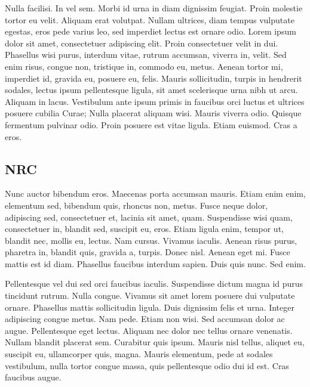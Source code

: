 Nulla facilisi. In vel sem. Morbi id urna in diam dignissim feugiat. Proin molestie tortor eu velit. Aliquam erat volutpat. Nullam ultrices, diam tempus vulputate egestas, eros pede varius leo, sed imperdiet lectus est ornare odio. Lorem ipsum dolor sit amet, consectetuer adipiscing elit. Proin consectetuer velit in dui. Phasellus wisi purus, interdum vitae, rutrum accumsan, viverra in, velit. Sed enim risus, congue non, tristique in, commodo eu, metus. Aenean tortor mi, imperdiet id, gravida eu, posuere eu, felis. Mauris sollicitudin, turpis in hendrerit sodales, lectus ipsum pellentesque ligula, sit amet scelerisque urna nibh ut arcu. Aliquam in lacus. Vestibulum ante ipsum primis in faucibus orci luctus et ultrices posuere cubilia Curae; Nulla placerat aliquam wisi. Mauris viverra odio. Quisque fermentum pulvinar odio. Proin posuere est vitae ligula. Etiam euismod. Cras a eros.

\subsection{NRC}

Nunc auctor bibendum eros. Maecenas porta accumsan mauris. Etiam enim enim, elementum sed, bibendum quis, rhoncus non, metus. Fusce neque dolor, adipiscing sed, consectetuer et, lacinia sit amet, quam. Suspendisse wisi quam, consectetuer in, blandit sed, suscipit eu, eros. Etiam ligula enim, tempor ut, blandit nec, mollis eu, lectus. Nam cursus. Vivamus iaculis. Aenean risus purus, pharetra in, blandit quis, gravida a, turpis. Donec nisl. Aenean eget mi. Fusce mattis est id diam. Phasellus faucibus interdum sapien. Duis quis nunc. Sed enim.

Pellentesque vel dui sed orci faucibus iaculis. Suspendisse dictum magna id purus tincidunt rutrum. Nulla congue. Vivamus sit amet lorem posuere dui vulputate ornare. Phasellus mattis sollicitudin ligula. Duis dignissim felis et urna. Integer adipiscing congue metus. Nam pede. Etiam non wisi. Sed accumsan dolor ac augue. Pellentesque eget lectus. Aliquam nec dolor nec tellus ornare venenatis. Nullam blandit placerat sem. Curabitur quis ipsum. Mauris nisl tellus, aliquet eu, suscipit eu, ullamcorper quis, magna. Mauris elementum, pede at sodales vestibulum, nulla tortor congue massa, quis pellentesque odio dui id est. Cras faucibus augue.

